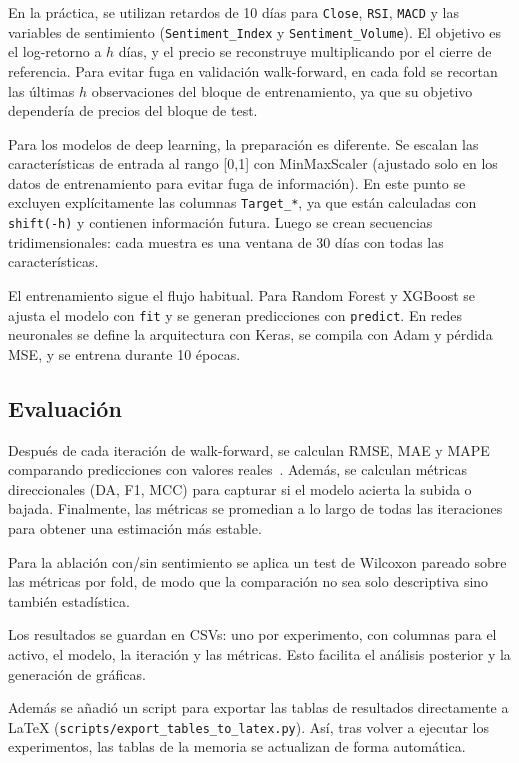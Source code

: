 En la práctica, se utilizan retardos de 10 días para \texttt{Close}, \texttt{RSI}, \texttt{MACD} y las variables de sentimiento (\texttt{Sentiment\_Index} y \texttt{Sentiment\_Volume}). El objetivo es el log-retorno a $h$ días, y el precio se reconstruye multiplicando por el cierre de referencia. Para evitar fuga en validación walk-forward, en cada fold se recortan las últimas $h$ observaciones del bloque de entrenamiento, ya que su objetivo dependería de precios del bloque de test.

Para los modelos de deep learning, la preparación es diferente. Se escalan las características de entrada al rango [0,1] con MinMaxScaler (ajustado solo en los datos de entrenamiento para evitar fuga de información). En este punto se excluyen explícitamente las columnas \texttt{Target\_*}, ya que están calculadas con \texttt{shift(-h)} y contienen información futura. Luego se crean secuencias tridimensionales: cada muestra es una ventana de 30 días con todas las características.

El entrenamiento sigue el flujo habitual. Para Random Forest y XGBoost se ajusta el modelo con \texttt{fit} y se generan predicciones con \texttt{predict}. En redes neuronales se define la arquitectura con Keras, se compila con Adam y pérdida MSE, y se entrena durante 10 épocas.

\subsection{Evaluación}

Después de cada iteración de walk-forward, se calculan RMSE, MAE y MAPE comparando predicciones con valores reales~\cite{hyndman2006another}. Además, se calculan métricas direccionales (DA, F1, MCC) para capturar si el modelo acierta la subida o bajada. Finalmente, las métricas se promedian a lo largo de todas las iteraciones para obtener una estimación más estable.

Para la ablación con/sin sentimiento se aplica un test de Wilcoxon pareado sobre las métricas por fold, de modo que la comparación no sea solo descriptiva sino también estadística.

Los resultados se guardan en CSVs: uno por experimento, con columnas para el activo, el modelo, la iteración y las métricas. Esto facilita el análisis posterior y la generación de gráficas.

Además se añadió un script para exportar las tablas de resultados directamente a LaTeX (\texttt{scripts/export\_tables\_to\_latex.py}). Así, tras volver a ejecutar los experimentos, las tablas de la memoria se actualizan de forma automática.

